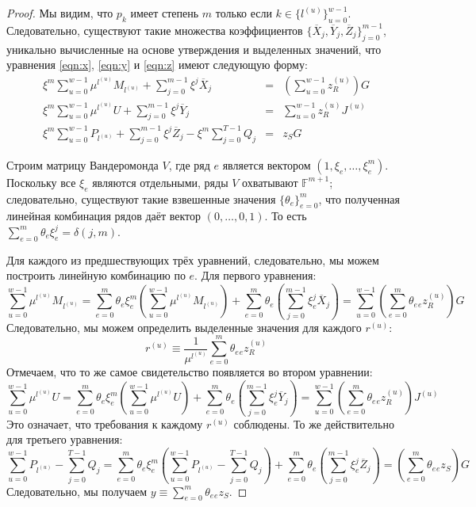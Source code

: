 \documentclass{article}
\newcommand{\F}{\mathbb{F}}
\newcommand{\sumj}{\sum_{j=0}^{m-1}}
\newcommand{\sumu}{\sum_{u=0}^{w-1}}
\theoremstyle{definition}
\begin{document}
\begin{proof}
Мы видим, что $p_k$ имеет степень $m$ только если $k \in \{l^{(u)}\}_{u=0}^{w-1}$.
Следовательно, существуют такие множества коэффициентов $\{\overline{X}_j,\overline{Y}_j,\overline{Z}_j\}_{j=0}^{m-1}$, уникально вычисленные на основе утверждения и выделенных значений, что уравнения \ref{eqn:x}, \ref{eqn:y} и \ref{eqn:z} имеют следующую форму:
\begin{eqnarray*}
\xi^m \sumu \mu^{l^{(u)}}M_{l^{(u)}} + \sumj \xi^j\overline{X}_j &=& \left( \sumu z^{(u)}_R \right)G \\
\xi^m \sumu \mu^{l^{(u)}}U + \sumj \xi^j\overline{Y}_j &=& \sumu z^{(u)}_RJ^{(u)} \\
\xi^m \sumu P_{l^{(u)}} + \sumj \xi^j\overline{Z}_j - \xi^m \sum_{j=0}^{T-1} Q_j &=& z_SG
\end{eqnarray*}

Строим матрицу Вандеромонда $V$, где ряд $e$ является вектором $(1,\xi_e,\ldots,\xi^m_e)$.
Поскольку все $\xi_e$ являются отдельными, ряды $V$ охватывают $\F^{m+1}$; следовательно, существуют такие взвешенные значения $\{\theta_e\}_{e=0}^m$, что полученная линейная комбинация рядов даёт вектор $(0,\ldots,0,1)$.
То есть $\sum_{e=0}^m \theta_e\xi_e^j = \delta(j,m)$.

Для каждого из предшествующих трёх уравнений, следовательно, мы можем построить линейную комбинацию по $e$. Для первого уравнения:
$$\sumu \mu^{l^{(u)}} M_{l^{(u)}} = \sum_{e=0}^m \theta_e\xi_e^m \left( \sumu \mu^{l^{(u)}} M_{l^{(u)}} \right) + \sum_{e=0}^m \theta_e \left( \sumj \xi_e^j \overline{X}_j \right) = \sumu \left( \sum_{e=0}^m \theta_e {}_ez^{(u)}_R \right) G$$
Следовательно, мы можем определить выделенные значения для каждого $r^{(u)}$:
$$r^{(u)} \equiv \frac{1}{\mu^{l^{(u)}}} \sum_{e=0}^m \theta_e {}_ez^{(u)}_R$$
Отмечаем, что то же самое свидетельство появляется во втором уравнении:
$$\sumu \mu^{l^{(u)}} U = \sum_{e=0}^m \theta_e\xi_e^m \left( \sumu \mu^{l^{(u)}} U \right) + \sum_{e=0}^m \theta_e \left( \sumj \xi_e^j \overline{Y}_j \right) = \sumu \left( \sum_{e=0}^m \theta_e {}_ez^{(u)}_R \right) J^{(u)}$$
Это означает, что требования к каждому $r^{(u)}$ соблюдены. То же действительно для третьего уравнения:
$$\sumu P_{l^{(u)}} - \sum_{j=0}^{T-1} Q_j = \sum_{e=0}^m \theta_e\xi_e^m \left( \sumu P_{l^{(u)}} - \sum_{j=0}^{T-1} Q_j \right) + \sum_{e=0}^m \theta_e \left( \sumj \xi_e^j \overline{Z}_j \right) = \left( \sum_{e=0}^m \theta_e {}_ez_S  \right)G$$
Следовательно, мы получаем $y \equiv \sum_{e=0}^m \theta_e {}_ez_S$.
\end{proof}
\end{document}
